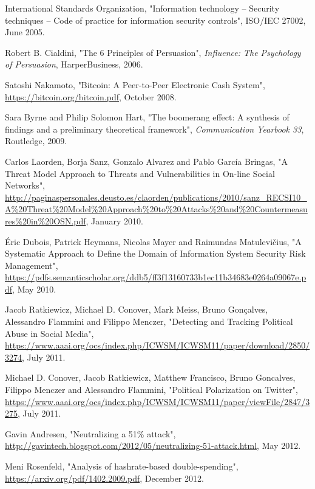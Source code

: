 \documentclass[12pt,a4paper]{article}
\begin{document}
\newpage
\begin{thebibliography}{9}

International Standards Organization,
"Information technology -- Security techniques -- Code of practice for information security controls",
ISO/IEC 27002,
June 2005.

Robert B. Cialdini,
"The 6 Principles of Persuasion",
\textit{Influence: The Psychology of Persuasion},
HarperBusiness, 2006.

Satoshi Nakamoto,
"Bitcoin: A Peer-to-Peer Electronic Cash System",
\url{https://bitcoin.org/bitcoin.pdf},
October 2008.

Sara Byrne and Philip Solomon Hart,
"The boomerang effect: A synthesis of findings and a preliminary theoretical framework",
\textit{Communication Yearbook 33},
Routledge, 2009.

Carlos Laorden, Borja Sanz, Gonzalo Alvarez and Pablo García Bringas,
"A Threat Model Approach to Threats and Vulnerabilities in On-line Social Networks",
\url{http://paginaspersonales.deusto.es/claorden/publications/2010/sanz_RECSI10_A%20Threat%20Model%20Approach%20to%20Attacks%20and%20Countermeasures%20in%20OSN.pdf},
January 2010.

Éric Dubois, Patrick Heymans, Nicolas Mayer and Raimundas Matulevičius,
"A Systematic Approach to Define the Domain of Information System Security Risk Management",
\url{https://pdfs.semanticscholar.org/ddb5/ff3f13160733b1ec11b34683e0264a09067e.pdf},
May 2010.

Jacob Ratkiewicz, Michael D. Conover, Mark Meiss, Bruno Gonçalves, Alessandro Flammini and Filippo Menczer,
"Detecting and Tracking Political Abuse in Social Media",
\url{https://www.aaai.org/ocs/index.php/ICWSM/ICWSM11/paper/download/2850/3274},
July 2011.

Michael D. Conover, Jacob Ratkiewicz, Matthew Francisco, Bruno Goncalves, Filippo Menczer and Alessandro Flammini,
"Political Polarization on Twitter",
\url{https://www.aaai.org/ocs/index.php/ICWSM/ICWSM11/paper/viewFile/2847/3275},
July 2011.

Gavin Andresen,
"Neutralizing a 51\% attack",
\url{http://gavintech.blogspot.com/2012/05/neutralizing-51-attack.html},
May 2012.

Meni Rosenfeld,
"Analysis of hashrate-based double-spending",
\url{https://arxiv.org/pdf/1402.2009.pdf},
December 2012.


\end{thebibliography}
\end{document}
